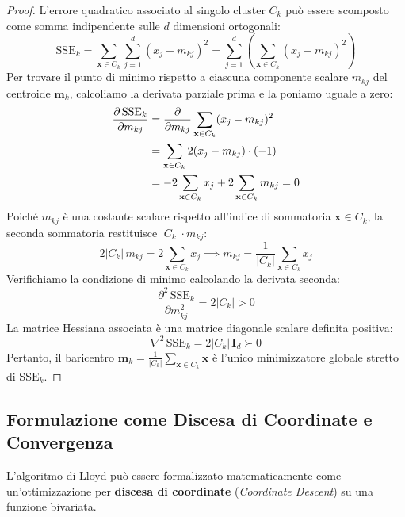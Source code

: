 \begin{proof}
L'errore quadratico associato al singolo cluster $C_k$ può essere scomposto come somma indipendente sulle $d$ dimensioni ortogonali:
\begin{equation}
    \mathrm{SSE}_k = \sum_{\mathbf{x} \in C_k} \sum_{j=1}^d (x_j - m_{kj})^2 = \sum_{j=1}^d \left( \sum_{\mathbf{x} \in C_k} (x_j - m_{kj})^2 \right)
\end{equation}
Per trovare il punto di minimo rispetto a ciascuna componente scalare $m_{kj}$ del centroide $\mathbf{m}_k$, calcoliamo la derivata parziale prima e la poniamo uguale a zero:
\begin{align}
    \frac{\partial \, \mathrm{SSE}_k}{\partial m_{kj}} &= \frac{\partial}{\partial m_{kj}} \sum_{\mathbf{x} \in C_k} (x_j - m_{kj})^2 \notag \\
    &= \sum_{\mathbf{x} \in C_k} 2 (x_j - m_{kj}) \cdot (-1) \notag \\
    &= -2 \sum_{\mathbf{x} \in C_k} x_j + 2 \sum_{\mathbf{x} \in C_k} m_{kj} = 0
\end{align}
Poiché $m_{kj}$ è una costante scalare rispetto all'indice di sommatoria $\mathbf{x} \in C_k$, la seconda sommatoria restituisce $|C_k| \cdot m_{kj}$:
\begin{equation}
    2 |C_k| \, m_{kj} = 2 \sum_{\mathbf{x} \in C_k} x_j \implies m_{kj} = \frac{1}{|C_k|} \sum_{\mathbf{x} \in C_k} x_j
\end{equation}
Verifichiamo la condizione di minimo calcolando la derivata seconda:
\begin{equation}
    \frac{\partial^2 \, \mathrm{SSE}_k}{\partial m_{kj}^2} = 2 |C_k| > 0
\end{equation}
La matrice Hessiana associata è una matrice diagonale scalare definita positiva:
\begin{equation}
    \nabla^2 \, \mathrm{SSE}_k = 2 |C_k| \, \mathbf{I}_d \succ 0
\end{equation}
Pertanto, il baricentro $\mathbf{m}_k = \frac{1}{|C_k|} \sum_{\mathbf{x} \in C_k} \mathbf{x}$ è l'unico minimizzatore globale stretto di $\mathrm{SSE}_k$.
\end{proof}

\subsection{Formulazione come Discesa di Coordinate e Convergenza}

L'algoritmo di Lloyd può essere formalizzato matematicamente come un'ottimizzazione per \textbf{discesa di coordinate} (\textit{Coordinate Descent}) su una funzione bivariata.

